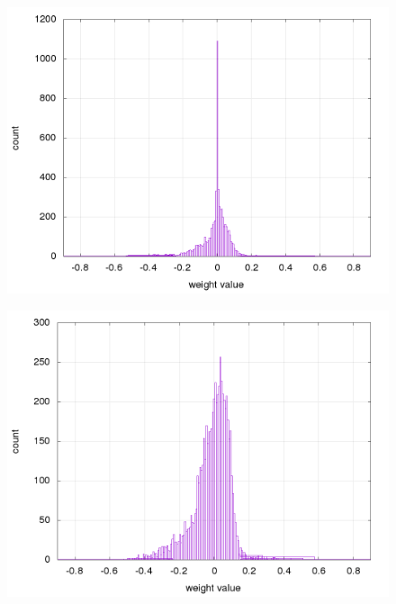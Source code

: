 \documentclass[10pt,a4paper]{article}
\begin{document}
\begin{figure}[!htb]
\centering
\begin{minipage}{.5\textwidth}
  \centering
  \includegraphics[scale=0.32]{../../results/rl_arcade/hnn_trained_0/supervised/layer_1_histogram.png}
  \label{img:AE+FNN sparse weights histogram}
\end{minipage}%
\begin{minipage}{.5\textwidth}
  \centering
  \includegraphics[scale=0.32]{../../results/rl_arcade/hnn_trained_5/supervised/layer_1_histogram.png}
  \label{img:AE+FNN no sparse weights histogram}
\end{minipage}
\end{figure}
\end{document}
